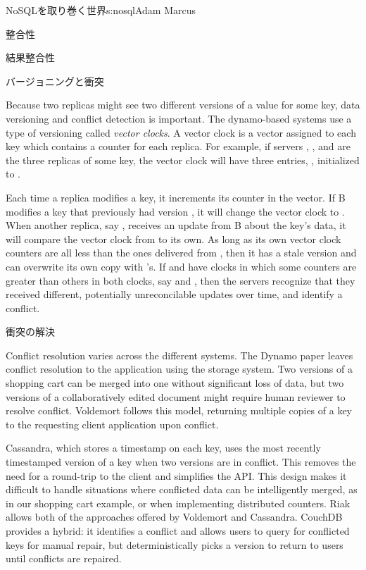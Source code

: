 \begin{aosachapter}{NoSQLを取り巻く世界}{s:nosql}{Adam Marcus}
\begin{aosasect1}{整合性}
\begin{aosasect2}{結果整合性}
\begin{aosasect3}{バージョニングと衝突}

Because two replicas might see two different versions of a value for
some key, data versioning and conflict detection is important.  The
dynamo-based systems use a type of versioning called \emph{vector
clocks}.  A vector clock is a vector assigned to each key which
contains a counter for each replica.  For example, if
servers , , and  are the three replicas of
some key, the vector clock will have three entries, , initialized to .

Each time a replica modifies a key, it increments its counter in the
vector.  If B modifies a key that previously had version , it will change the vector clock to .  When
another replica, say , receives an update from B about the
key's data, it will compare the vector clock from  to its own.
As long as its own vector clock counters are all less than the ones
delivered from , then it has a stale version and can overwrite
its own copy with 's.  If  and  have clocks in
which some counters are greater than others in both clocks, say
 and , then the servers recognize
that they received different, potentially unreconcilable updates over
time, and identify a conflict.

\end{aosasect3}

\begin{aosasect3}{衝突の解決}

Conflict resolution varies across the different systems.  The Dynamo
paper leaves conflict resolution to the application using the
storage system.  Two versions of a shopping cart can be merged into
one without significant loss of data, but two versions of a
collaboratively edited document might require human reviewer to
resolve conflict.  Voldemort follows this model, returning multiple
copies of a key to the requesting client application upon conflict.

Cassandra, which stores a timestamp on each key, uses the most
recently timestamped version of a key when two versions are in
conflict.  This removes the need for a round-trip to the client and
simplifies the API. This design makes it difficult to handle
situations where conflicted data can be intelligently merged, as in
our shopping cart example, or when implementing distributed counters.
Riak allows both of the approaches offered by Voldemort and Cassandra.
CouchDB provides a hybrid: it identifies a conflict and allows users
to query for conflicted keys for manual repair, but deterministically
picks a version to return to users until conflicts are repaired.


\end{aosasect3}
\end{aosasect2}
\end{aosasect1}
\end{aosachapter}

